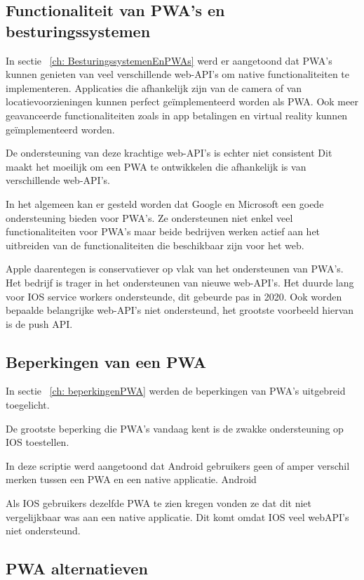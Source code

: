 	\subsection{Functionaliteit van PWA's en besturingssystemen}
	
		In sectie ~\ref{ch: BesturingssystemenEnPWAs} werd er aangetoond dat PWA's kunnen genieten van veel verschillende web-API's om native functionaliteiten te implementeren. Applicaties die afhankelijk zijn van de camera of van locatievoorzieningen kunnen perfect geïmplementeerd worden als PWA. Ook meer geavanceerde functionaliteiten zoals in app betalingen en virtual reality kunnen geïmplementeerd worden.
		
		De ondersteuning van deze krachtige web-API's is echter niet consistent Dit maakt het moeilijk om een PWA te ontwikkelen die afhankelijk is van verschillende web-API's. 
		
		In het algemeen kan er gesteld worden dat Google en Microsoft een goede ondersteuning bieden voor PWA's. Ze ondersteunen niet enkel veel functionaliteiten voor PWA's maar beide bedrijven werken actief aan het uitbreiden van de functionaliteiten die beschikbaar zijn voor het web. 
		
		Apple daarentegen is conservatiever op vlak van het ondersteunen van PWA's. Het bedrijf is trager in het ondersteunen van nieuwe web-API's. 
		Het duurde lang voor IOS service workers ondersteunde, dit gebeurde pas in 2020. Ook worden bepaalde belangrijke web-API's niet ondersteund, het grootste voorbeeld hiervan is de push API.
					
	\subsection{Beperkingen van een PWA}
		In sectie ~\ref{ch: beperkingenPWA} werden de beperkingen van PWA's uitgebreid toegelicht. 
	
		De grootste beperking die PWA's vandaag kent is de zwakke ondersteuning op IOS toestellen.
		
		In deze scriptie werd aangetoond dat Android gebruikers geen of amper verschil merken tussen een PWA en een native applicatie. Android  
		
		Als IOS gebruikers dezelfde PWA te zien kregen vonden ze dat dit niet vergelijkbaar was aan een native applicatie. Dit komt omdat IOS veel webAPI's niet ondersteund.
		
	 
	
	\subsection{PWA alternatieven}
		
